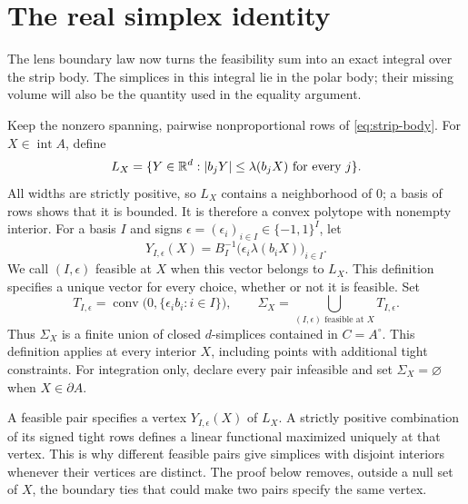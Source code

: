 \section{The real simplex identity}\label{sec:simplex}

The lens boundary law now turns the feasibility sum into an exact
integral over the strip body. The simplices in this integral lie in the
polar body; their missing volume will also be the quantity used in the
equality argument.

Keep the nonzero spanning, pairwise nonproportional rows of
\eqref{eq:strip-body}. For $X\in\operatorname{int}A$, define
\begin{equation}\label{eq:real-feasibility-body}
 L_X=\{Y\in\mathbb R^d:|b_jY|\leq\lambda(b_jX)
                         \text{ for every }j\}.
\end{equation}
All widths are strictly positive, so $L_X$ contains a neighborhood of
$0$; a basis of rows shows that it is bounded. It is therefore a convex
polytope with nonempty interior.
For a basis $I$ and signs $\epsilon=(\epsilon_i)_{i\in I}\in\{-1,1\}^I$,
let
\[
 Y_{I,\epsilon}(X)=B_I^{-1}
          \bigl(\epsilon_i\lambda(b_iX)\bigr)_{i\in I}.
\]
We call $(I,\epsilon)$ feasible at $X$ when this vector belongs to $L_X$.
This definition specifies a unique vector for every choice, whether or
not it is feasible. Set
\begin{equation}\label{eq:feasible-simplex-union}
 T_{I,\epsilon}=\operatorname{conv}
                  \bigl(0,\{\epsilon_i b_i:i\in I\}\bigr),
 \qquad
 \Sigma_X=\bigcup_{(I,\epsilon)\text{ feasible at }X}T_{I,\epsilon}.
\end{equation}
Thus $\Sigma_X$ is a finite union of closed $d$-simplices contained in
$C=A^\circ$. This definition applies at every interior $X$, including
points with additional tight constraints. For integration only, declare
every pair infeasible and set $\Sigma_X=\varnothing$ when
$X\in\partial A$.

A feasible pair specifies a vertex $Y_{I,\epsilon}(X)$ of $L_X$.
A strictly positive combination of its signed tight rows defines a
linear functional maximized uniquely at that vertex. This is why
different feasible pairs give simplices with disjoint interiors
whenever their vertices are distinct. The proof below removes, outside
a null set of $X$, the boundary ties that could make two pairs specify
the same vertex.

